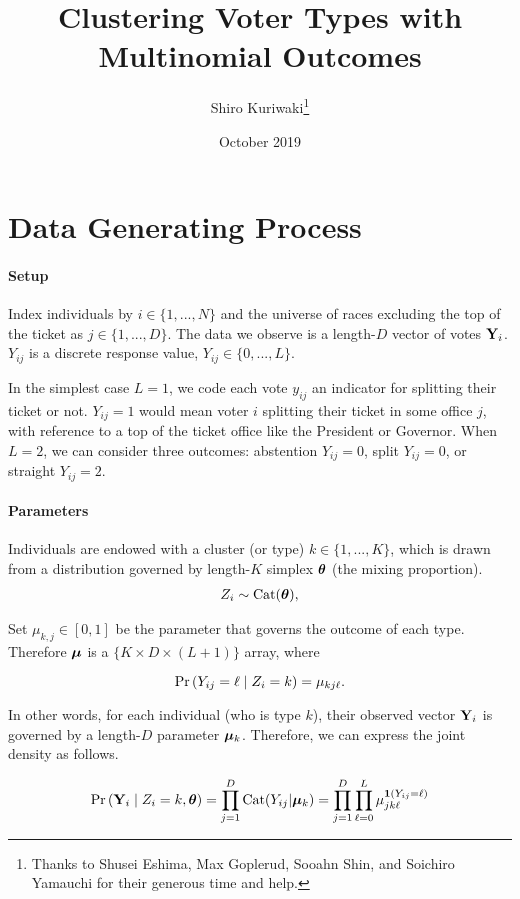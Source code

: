 \documentclass[11pt]{article}
\title{ \Large\textbf{Clustering Voter Types with Multinomial Outcomes}}
\author{\normalsize  Shiro Kuriwaki\thanks{Thanks to Shusei Eshima, Max Goplerud, Sooahn Shin, and Soichiro Yamauchi for their generous time and help.} }
\date{\normalsize October 2019}
\begin{document}
\maketitle

\onehalfspacing


\section{Data Generating Process}


\paragraph{Setup}

Index individuals by \(i \in \{1, ..., N\}\) and the universe of races
excluding the top of the ticket as \(j \in \{1, ..., D\}\). The data we
observe is a length-\(D\) vector of votes \(\mathbf{Y}_i\). \(Y_{ij}\) is a
discrete response value, \(Y_{ij} \in \{0, ..., L\}\). 

In the simplest case \(L = 1\), we code each vote \(y_{ij}\) an indicator for splitting their ticket or not. \(Y_{ij} = 1\) would mean voter \(i\) splitting their ticket in some office \(j\), with reference to a top of the ticket office like the President or Governor. When \(L = 2\), we can consider three outcomes: abstention \(Y_{ij} = 0\), split \(Y_{ij} = 0\), or straight \(Y_{ij} = 2\).


\paragraph{Parameters}


Individuals are endowed with a cluster (or type) \(k \in \{1, ..., K\}\), which is drawn from a distribution governed by length-\(K\) simplex \(\bm{\theta}\) (the mixing proportion).
\begin{align*}
Z_i \sim  \text{Cat}(\bm{\theta}),
\end{align*}

Set \(\mu_{k, j} \in [0, 1]\) be the parameter that governs the outcome of each type. Therefore \(\bm{\mu}\) is a \(\{K \times D \times (L + 1)\}\) array, where 

 \[\mathbb{\Pr}\left(Y_{ij} = \ell \mid Z_i = k\right) = \mu_{kj\ell}.\]

In other words, for each individual (who is  type \(k\)), their observed vector \(\mathbf{Y}_{i}\) is governed by a length-\(D\) parameter \(\bm{\mu}_{k}\). Therefore, we can express the joint density as follows. 

\begin{align}
\mathbb{\Pr}\left(\mathbf{Y}_{i} \mid Z_{i} = k, \bm{\theta}\right) = \prod^{D}_{j = 1} \text{Cat}(Y_{ij} | \bm{\mu}_k) = \prod^{D}_{j = 1}\prod^{L}_{\ell=0} \mu_{jk\ell}^{\bm{1}\left(Y_{ij} = \ell\right)}
\end{align}
\end{document}
